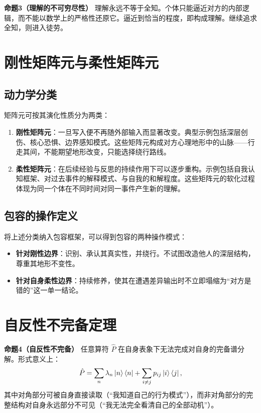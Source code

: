 ﻿\documentclass[12pt,a4paper]{ctexart}
\begin{document}
\textbf{命题3（理解的不可穷尽性）} 理解永远不等于全知。个体只能逼近对方的内部逻辑，而不能以数学上的严格性还原它。逼近到恰当的程度，即构成理解。继续追求全知，则进入徒劳。

\section{刚性矩阵元与柔性矩阵元}

\subsection{动力学分类}

矩阵元可按其演化性质分为两类：

\begin{enumerate}[label=(\arabic*)]
    \item \textbf{刚性矩阵元}：一旦写入便不再随外部输入而显著改变。典型示例包括深层创伤、核心恐惧、边界感知模式。这些矩阵元构成对方心理地形中的山脉——行走其间，不能期望地形改变，只能选择绕行路线。
    \item \textbf{柔性矩阵元}：在后续经验与反思的持续作用下可以逐步重构。示例包括自我认知框架、对过去事件的解释模式、与自我的和解程度。这些矩阵元的软化过程体现为同一个体在不同时间对同一事件产生新的理解。
\end{enumerate}

\subsection{包容的操作定义}

将上述分类纳入包容框架，可以得到包容的两种操作模式：

\begin{itemize}
    \item \textbf{针对刚性边界}：识别、承认其真实性，并绕行。不试图改造他人的深层结构，尊重其地形不变性。
    \item \textbf{针对自身柔性边界}：持续修养，使其在遭遇差异输出时不立即塌缩为``对方是错的''这一单一结论。
\end{itemize}


\section{自反性不完备定理}

\textbf{命题4（自反性不完备）} 任意算符 $\hat{P}$ 在自身表象下无法完成对自身的完备谱分解。形式意义上：
\begin{equation}
\hat{P} = \sum_{n} \lambda_n \ket{n}\bra{n} + \sum_{i\neq j} p_{ij} \ket{i}\bra{j},
\end{equation}
其中对角部分可被自身直接读取（“我知道自己的行为模式”），而非对角部分的完整结构对自身永远部分不可见（“我无法完全看清自己的全部动机”）。
\end{document}
